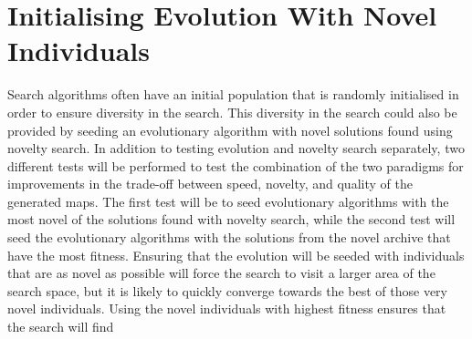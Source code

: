 \section{Initialising Evolution With Novel Individuals}
\label{methodology_evolutionnovelseeds}
Search algorithms often have an initial population that is randomly initialised in order to ensure diversity in the search. This diversity in the search could also be provided by seeding an evolutionary algorithm with novel solutions found using novelty search. In addition to testing evolution and novelty search separately, two different tests will be performed to test the combination of the two paradigms for improvements in the trade-off between speed, novelty, and quality of the generated maps. The first test will be to seed evolutionary algorithms with the most novel of the solutions found with novelty search, while the second test will seed the evolutionary algorithms with the solutions from the novel archive that have the most fitness. Ensuring that the evolution will be seeded with individuals that are as novel as possible will force the search to visit a larger area of the search space, but it is likely to quickly converge towards the best of those very novel individuals. Using the novel individuals with highest fitness ensures that the search will find 